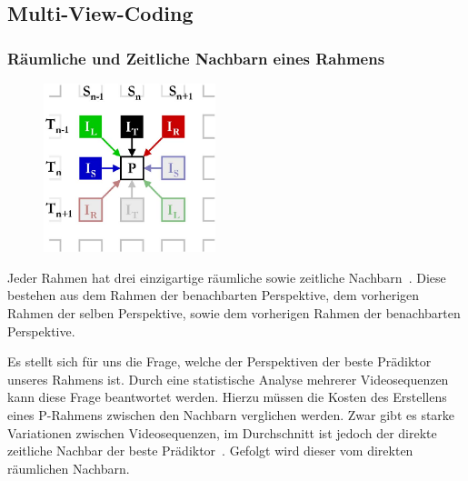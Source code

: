 \subsection{Multi-View-Coding}\label{subsec:mvc}

\subsubsection{R\"aumliche und Zeitliche Nachbarn eines Rahmens}
\begin{figure}
    \includegraphics[width=5cm]{../img/prediction}
\end{figure}

Jeder Rahmen hat drei einzigartige r\"aumliche sowie zeitliche Nachbarn~\cite{paper}.
Diese bestehen aus dem Rahmen der benachbarten Perspektive, dem vorherigen Rahmen der selben Perspektive, sowie
dem vorherigen Rahmen der benachbarten Perspektive.

\noindent\newline Es stellt sich f\"ur uns die Frage, welche der Perspektiven der beste Pr\"adiktor unseres Rahmens ist.
Durch eine statistische Analyse mehrerer Videosequenzen kann diese Frage beantwortet werden.
Hierzu m\"ussen die Kosten des Erstellens eines P-Rahmens zwischen den Nachbarn verglichen werden.
Zwar gibt es starke Variationen zwischen Videosequenzen, im Durchschnitt ist jedoch der direkte zeitliche Nachbar
der beste Pr\"adiktor~\cite{paper}.
Gefolgt wird dieser vom direkten r\"aumlichen Nachbarn.
